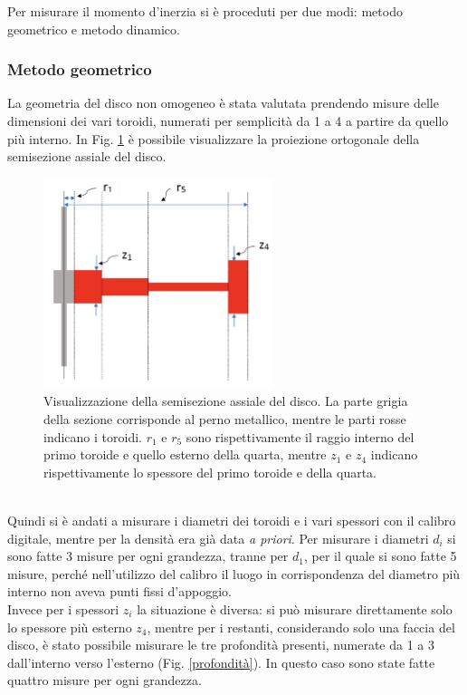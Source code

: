 Per misurare il momento d'inerzia si è proceduti per due modi: metodo geometrico e metodo dinamico.

\subsubsection*{Metodo geometrico}

La geometria del disco non omogeneo è stata valutata prendendo misure delle dimensioni dei vari toroidi, numerati per semplicità da 1 a 4 a partire da quello più interno. In Fig. \ref{sezione} è possibile visualizzare la proiezione ortogonale della semisezione assiale del disco.
    \begin{figure}[h]
        \centering
        \includegraphics[width=0.6\textwidth]{image/Sezionedisco.jpeg}
        \caption[\small Visualizzazione della semisezione assiale del disco.]{\small Visualizzazione della semisezione assiale del disco. La parte grigia della sezione corrisponde al perno metallico, mentre le parti rosse indicano i toroidi. $r_1$ e $r_5$ sono rispettivamente il raggio interno del primo toroide e quello esterno della quarta, mentre $z_1$ e $z_4$ indicano rispettivamente lo spessore del primo toroide e della quarta.}
        \label{sezione}
    \end{figure}\\
Quindi si è andati a misurare i diametri dei toroidi e i vari spessori con il calibro digitale, mentre per la densità era già data \textit{a priori}.
Per misurare i diametri $d_i$ si sono fatte 3 misure per ogni grandezza, tranne per $d_1$, per il quale si sono fatte 5 misure, perché nell'utilizzo del calibro il luogo in corrispondenza del diametro più interno non aveva punti fissi d'appoggio.\\
Invece per i spessori $z_i$ la situazione è diversa: si può misurare direttamente solo lo spessore più esterno $z_4$, mentre per i restanti, considerando solo una faccia del disco, è stato possibile misurare le tre profondità presenti, numerate da 1 a 3 dall'interno verso l'esterno (Fig. \ref{profondità}). In questo caso sono state fatte quattro misure per ogni grandezza.
